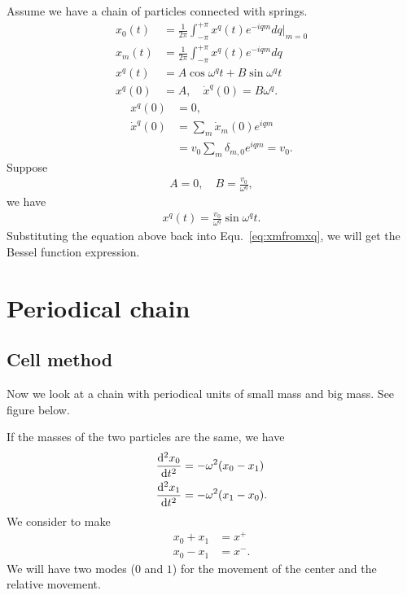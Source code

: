 Assume we have a chain of particles connected with springs. 
\begin{align}
x_0(t)&=\frac{1}{2\pi} \int_{-\pi}^{+\pi} x^q(t)e^{-iqm} dq|_{m=0}\\
x_m(t)&=\frac{1}{2\pi} \int_{-\pi}^{+\pi} x^q(t)e^{-iqm} dq \label{eq:xmfromxq}\\
x^q(t) &=A\cos \omega^q t+ B \sin \omega^q t\\
x^q(0) &=A,\quad \dot{x}^q(0)=B\omega^q.
\end{align}
\begin{align}
x^q(0)&=0,\\
\dot{x}^q(0)&=\sum_m \dot{x}_m(0)e^{iqm}\nonumber\\
&= v_0 \sum_m \delta_{m,0} e^{iqm}=v_0.
\end{align}
Suppose
\begin{align}
A=0, \quad B=\frac{v_0}{\omega^q},
\end{align}
we have
\begin{align}
x^q(t)=\frac{v_0}{\omega^q}\sin \omega^q t.
\end{align}
Substituting the equation above back into Equ.~\ref{eq:xmfromxq}, we will get the Bessel function expression.

\section{Periodical chain}\label{sec:periodicchain}
\subsection{Cell method}
Now we look at a chain with periodical units of small mass and big mass. See figure below.


If the masses of the two particles are the same, we have 
\begin{align}
\frac{{\mathrm d}^2 {x_0}}{{\mathrm d}t^2}&=-\omega^2 (x_0-x_1)\\
\frac{{\mathrm d}^2 {x_1}}{{\mathrm d}t^2}&=-\omega^2 (x_1-x_0).
\end{align}
We consider to make 
\begin{align}
x_0+x_1 &=x^+\\
x_0-x_1 &= x^-.
\end{align}
We will have two modes ($0$ and $ 1 $) for the movement of the center and the relative movement. 

